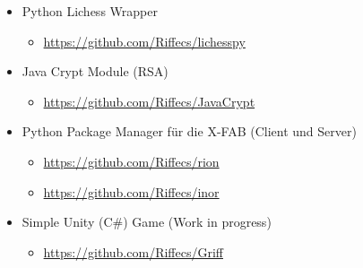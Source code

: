 \documentclass[10pt,a4paper,ragged2e,withhyper]{altacv}
\begin{document}
\begin{paracol}{2}
\begin{itemize}
    \item Python Lichess Wrapper
    \begin{itemize}
        \item \url{https://github.com/Riffecs/lichesspy}
    \end{itemize}
    \item Java Crypt Module (RSA)
    \begin{itemize}
        \item \url{https://github.com/Riffecs/JavaCrypt}
    \end{itemize}
    \item Python Package Manager für die X-FAB (Client und Server)
    \begin{itemize}
        \item \url{https://github.com/Riffecs/rion}
         \item \url{https://github.com/Riffecs/inor}
    \end{itemize}
    \item Simple Unity (C\#) Game (Work in progress)
    \begin{itemize}
        \item \url{https://github.com/Riffecs/Griff}
    \end{itemize}
    
\end{itemize}

\end{paracol}
\end{document}
